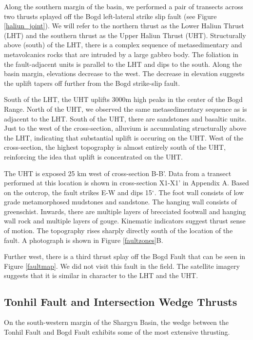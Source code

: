 Along the southern margin of the basin, we performed a pair of transects across two thrusts splayed off the Bogd left-lateral strike slip fault (see Figure \ref{haliun_joint}). We will refer to the northern thrust as the Lower Haliun Thrust (LHT) and the southern thrust as the Upper Haliun Thrust (UHT). Structurally above (south) of the LHT, there is a complex sequence of metasedimentary and metavolcanics rocks that are intruded by a large gabbro body. The foliation in the fault-adjacent units is parallel to the LHT and dips to the south. Along the basin margin, elevations decrease to the west. The decrease in elevation suggests the uplift tapers off further from the Bogd strike-slip fault. 

South of the LHT, the UHT uplifts 3000m high peaks in the center of the Bogd Range. North of the UHT, we observed the same metasedimentary sequence as is adjacent to the LHT. South of the UHT, there are sandstones and basaltic units. Just to the west of the cross-section, alluvium is accumulating structurally above the LHT, indicating that substantial uplift is occuring on the UHT. West of the cross-section, the highest topography is almost entirely south of the UHT, reinforcing the idea that uplift is concentrated on the UHT.

The UHT is exposed 25 km west of cross-section B-B'. Data from a transect performed at this location is shown in cross-section X1-X1' in Appendix A. Based on the outcrop, the fault strikes E-W and dips 15$^{\circ}$. The foot wall consists of low grade metamorphosed mudstones and sandstone. The hanging wall consists of greenschist. Inwards, there are multiple layers of brecciated footwall and hanging wall rock and multiple layers of gouge. Kinematic indicators suggest thrust sense of motion. The topography rises sharply directly south of the location of the fault. A photograph is shown in Figure \ref{faultzones}B. 

Further west, there is a third thrust splay off the Bogd Fault that can be seen in Figure \ref{faultmap}. We did not visit this fault in the field. The satellite imagery suggests that it is similar in character to the LHT and the UHT.

\subsection{Tonhil Fault and Intersection Wedge Thrusts}
On the south-western margin of the Shargyn Basin, the wedge between the Tonhil Fault and Bogd Fault exhibits some of the most extensive thrusting. 


